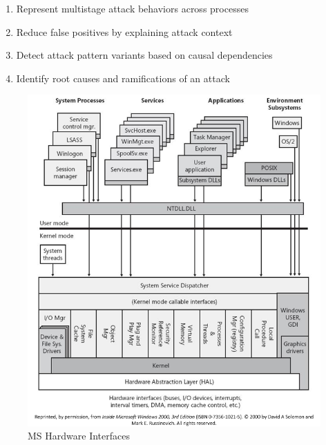 \documentclass{article}
\begin{document}
\begin{enumerate}
\item Represent multistage attack behaviors across processes
\item Reduce false positives by explaining attack context
\item Detect attack pattern variants based on causal dependencies
\item Identify root causes and ramifications of an attack
\end{enumerate}



\begin{figure}[h]
\includegraphics[scale=0.4]{ms_hardware_interfaces.png}
\caption{MS Hardware Interfaces}
\end{figure}

\printbibliography
\end{document}
